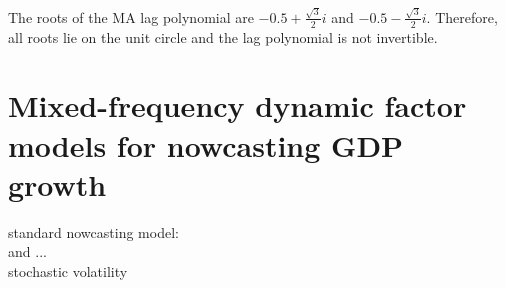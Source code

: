 The roots of the MA lag polynomial are $-0.5+\frac{\sqrt{3}}{2} i$ and $-0.5-\frac{\sqrt{3}}{2} i$. Therefore, all roots lie on the unit circle and the lag polynomial is not invertible.\\


\section{Mixed-frequency dynamic factor models for nowcasting GDP growth}



standard nowcasting model: \\

\citet{LucianiRicci2014} and \citet{DAgostinoEtal2016} ... \\

\citet{MarcellinoEtal2016} stochastic volatility \\

\citet{AntolinDiazEtal2017} \\
